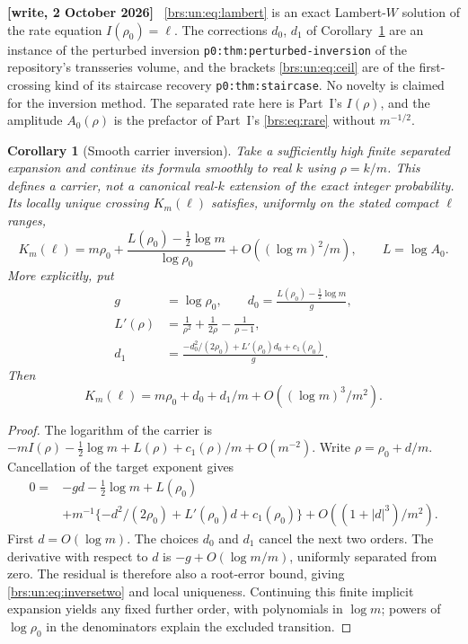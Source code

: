 \documentclass[11pt]{article}
\numberwithin{equation}{section}
\newtheorem{corollary}[theorem]{Corollary}
\theoremstyle{remark}\newtheorem{remark}[theorem]{Remark}
\newenvironment{writenote}{\par\smallskip\begingroup\small\noindent\textbf{[write, 2 October 2026]}\ }{\par\endgroup\smallskip}
\begin{document}
\begin{writenote}
\eqref{brs:un:eq:lambert} is an exact Lambert-$W$ solution of the rate equation $I(\rho_0)=\ell$. The corrections $d_0$, $d_1$ of Corollary~\ref{brs:un:cor:inverse} are an instance of the perturbed inversion \texttt{p0:thm:perturbed-inversion} of the repository's transseries volume, and the brackets \eqref{brs:un:eq:ceil} are of the first-crossing kind of its staircase recovery \texttt{p0:thm:staircase}. No novelty is claimed for the inversion method. The separated rate here is Part~I's $I(\rho)$, and the amplitude $A_0(\rho)$ is the prefactor of Part~I's \eqref{brs:eq:rare} without $m^{-1/2}$.
\end{writenote}

\begin{corollary}[Smooth carrier inversion]\label{brs:un:cor:inverse}
Take a sufficiently high finite separated expansion and continue its
formula smoothly to real $k$ using $\rho=k/m$.  This defines a
\emph{carrier}, not a canonical real-$k$ extension of the exact integer
probability.  Its locally unique crossing $K_m(\ell)$ satisfies,
uniformly on the stated compact $\ell$ ranges,
\begin{equation}\label{brs:un:eq:inverseone}
 K_m(\ell)=m\rho_0+
       \frac{L(\rho_0)-\tfrac12\log m}{\log\rho_0}
       +O((\log m)^2/m),\qquad L=\log A_0.
\end{equation}
More explicitly, put
\begin{align}\label{brs:un:eq:d0d1}
 g&=\log\rho_0,\qquad
 d_0=\frac{L(\rho_0)-\tfrac12\log m}{g},\\
 L'(\rho)&=\frac1{\rho^2}+\frac1{2\rho}-\frac1{\rho-1},\nonumber\\
 d_1&=\frac{-d_0^2/(2\rho_0)+L'(\rho_0)d_0+c_1(\rho_0)}{g}.
 \nonumber
\end{align}
Then
\begin{equation}\label{brs:un:eq:inversetwo}
 K_m(\ell)=m\rho_0+d_0+d_1/m+O((\log m)^3/m^2).
\end{equation}
\end{corollary}

\begin{proof}
The logarithm of the carrier is
$-mI(\rho)-\tfrac12\log m+L(\rho)+c_1(\rho)/m+O(m^{-2})$.
Write $\rho=\rho_0+d/m$.  Cancellation of the target exponent gives
\begin{align}\label{brs:un:eq:inverseproof}
 0={}&-gd-\tfrac12\log m+L(\rho_0)\\
 &+m^{-1}\{-d^2/(2\rho_0)+L'(\rho_0)d+c_1(\rho_0)\}
       +O((1+|d|^3)/m^2).\nonumber
\end{align}
First $d=O(\log m)$.  The choices $d_0$ and $d_1$ cancel the next
two orders.  The derivative with respect to $d$ is
$-g+O(\log m/m)$, uniformly separated from zero.  The residual is
therefore also a root-error bound, giving \eqref{brs:un:eq:inversetwo} and
local uniqueness.  Continuing this finite implicit expansion yields
any fixed further order, with polynomials in $\log m$; powers of
$\log\rho_0$ in the denominators explain the excluded transition.
\end{proof}
\end{document}
